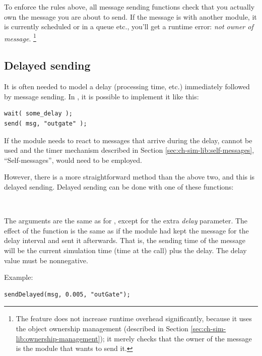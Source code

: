 To enforce the rules above, all message sending functions
check that you actually own the message you are about to send.
If the message is with another module, it is currently scheduled or
in a queue etc., you'll get a runtime error: \textit{not owner of message}.
  \footnote{The feature does not increase runtime overhead significantly, because
  it uses the object ownership management (described in
  Section \ref{sec:ch-sim-lib:ownership-management});
  it merely checks that the owner of the message is the module that
  wants to send it.}



\subsection{Delayed sending}

It is often needed to model a delay (processing time, etc.) immediately
followed by message sending. In {\opp}, it is possible to implement
it like this:

\begin{verbatim}
wait( some_delay );
send( msg, "outgate" );
\end{verbatim}


If the module needs to react to messages that arrive during the delay,
 cannot be used and the timer mechanism described in
Section \ref{sec:ch-sim-lib:self-messages}, ``Self-messages'', would
need to be employed.


However, there is a more straightforward method than the above two,
and this is delayed sending. Delayed sending
can be done with one of these functions:

\\


The arguments are the same as for , except for the extra \textit{delay}
parameter. The effect of the function is the same as if the module
had kept the message for the delay interval and sent it afterwards.
That is, the sending time of the message will be the current
simulation time (time at the  call) plus the delay.
The delay value must be nonnegative.

Example:

\begin{verbatim}
sendDelayed(msg, 0.005, "outGate");
\end{verbatim}




